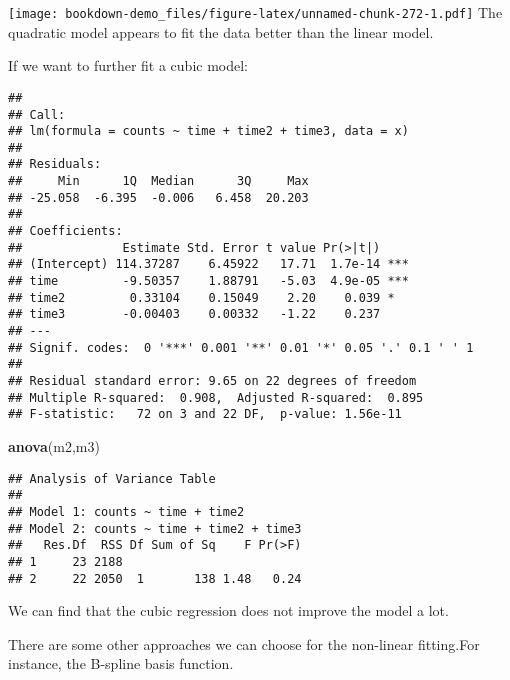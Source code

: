 \documentclass[]{book}
\newenvironment{Shaded}{\begin{snugshade}}{\end{snugshade}}
\newcommand{\KeywordTok}[1]{\textcolor[rgb]{0.13,0.29,0.53}{\textbf{#1}}}
\newcommand{\DataTypeTok}[1]{\textcolor[rgb]{0.13,0.29,0.53}{#1}}
\newcommand{\DecValTok}[1]{\textcolor[rgb]{0.00,0.00,0.81}{#1}}
\newcommand{\StringTok}[1]{\textcolor[rgb]{0.31,0.60,0.02}{#1}}
\newcommand{\OperatorTok}[1]{\textcolor[rgb]{0.81,0.36,0.00}{\textbf{#1}}}
\newcommand{\NormalTok}[1]{#1}
\theoremstyle{definition}
\theoremstyle{definition}
\theoremstyle{definition}
\theoremstyle{remark}
\begin{document}
\texttt{[image: bookdown-demo\_files/figure-latex/unnamed-chunk-272-1.pdf]}
The quadratic model appears to fit the data better than the linear
model.

If we want to further fit a cubic model:

\begin{Shaded}
\end{Shaded}

\begin{verbatim}
## 
## Call:
## lm(formula = counts ~ time + time2 + time3, data = x)
## 
## Residuals:
##     Min      1Q  Median      3Q     Max 
## -25.058  -6.395  -0.006   6.458  20.203 
## 
## Coefficients:
##              Estimate Std. Error t value Pr(>|t|)    
## (Intercept) 114.37287    6.45922   17.71  1.7e-14 ***
## time         -9.50357    1.88791   -5.03  4.9e-05 ***
## time2         0.33104    0.15049    2.20    0.039 *  
## time3        -0.00403    0.00332   -1.22    0.237    
## ---
## Signif. codes:  0 '***' 0.001 '**' 0.01 '*' 0.05 '.' 0.1 ' ' 1
## 
## Residual standard error: 9.65 on 22 degrees of freedom
## Multiple R-squared:  0.908,  Adjusted R-squared:  0.895 
## F-statistic:   72 on 3 and 22 DF,  p-value: 1.56e-11
\end{verbatim}

\begin{Shaded}
\begin{Highlighting}[]
\KeywordTok{anova}\NormalTok{(m2,m3)}
\end{Highlighting}
\end{Shaded}

\begin{verbatim}
## Analysis of Variance Table
## 
## Model 1: counts ~ time + time2
## Model 2: counts ~ time + time2 + time3
##   Res.Df  RSS Df Sum of Sq    F Pr(>F)
## 1     23 2188                         
## 2     22 2050  1       138 1.48   0.24
\end{verbatim}

We can find that the cubic regression does not improve the model a lot.

There are some other approaches we can choose for the non-linear
fitting.For instance, the B-spline basis function.
\end{document}
